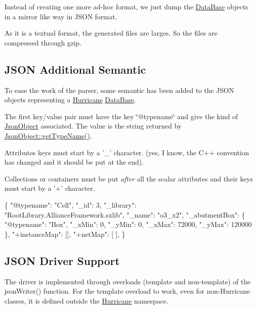 Instead of creating one more ad-\/hoc format, we just dump the \hyperlink{classHurricane_1_1DataBase}{Data\-Base} objects in a mirror like way in J\-S\-O\-N format.

As it is a textual format, the generated files are larges. So the files are compressed through {\ttfamily gzip}.\hypertarget{group__JsonSupport_secJsonSemantic}{}\subsection{J\-S\-O\-N Additional Semantic}\label{group__JsonSupport_secJsonSemantic}
To ease the work of the parser, some semantic has been added to the J\-S\-O\-N objects representing a \hyperlink{namespaceHurricane}{Hurricane} \hyperlink{classHurricane_1_1DataBase}{Data\-Base}.
\begin{DoxyEnumerate}
\item The first key/value pair must have the key {\ttfamily \char`\"{}@typename\char`\"{}} and give the kind of \hyperlink{classHurricane_1_1JsonObject}{Json\-Object} associated. The value is the string returned by {\ttfamily \hyperlink{classHurricane_1_1JsonObject_a947e1c3f8dbae63bb2d086b5b827a2a5}{Json\-Object\-::get\-Type\-Name()}}.
\item Attributes keys must start by a {\ttfamily '\-\_\-'} character. (yes, I know, the C++ convention has changed and it should be put at the end).
\item Collections or containers must be put {\itshape after} all the scalar attributes and their keys must start by a {\ttfamily '+'} character.
\end{DoxyEnumerate}


\begin{DoxyCode}
\{
  \textcolor{stringliteral}{"@typename"}: \textcolor{stringliteral}{"Cell"},
  \textcolor{stringliteral}{"\_id"}: 3,
  \textcolor{stringliteral}{"\_library"}: \textcolor{stringliteral}{"RootLibrary.AllianceFramework.sxlib"},
  \textcolor{stringliteral}{"\_name"}: \textcolor{stringliteral}{"o3\_x2"},
  \textcolor{stringliteral}{"\_abutmentBox"}: \{
    \textcolor{stringliteral}{"@typename"}: \textcolor{stringliteral}{"Box"},
    \textcolor{stringliteral}{"\_xMin"}: 0,
    \textcolor{stringliteral}{"\_yMin"}: 0,
    \textcolor{stringliteral}{"\_xMax"}: 72000,
    \textcolor{stringliteral}{"\_yMax"}: 120000
  \},
  \textcolor{stringliteral}{"+instanceMap"}: [],
  \textcolor{stringliteral}{"+netMap"}: [
  ],
\}
\end{DoxyCode}
\hypertarget{group__JsonSupport_secJsonDriver}{}\subsection{J\-S\-O\-N Driver Support}\label{group__JsonSupport_secJsonDriver}
The driver is implemented through overloads (template and non-\/template) of the {\ttfamily json\-Writer()} function. For the template overload to work, even for non-\/\-Hurricane classes, it is defined outside the \hyperlink{namespaceHurricane}{Hurricane} namespace.

